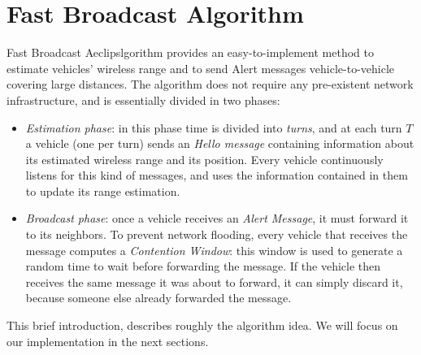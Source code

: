 \section{Fast Broadcast Algorithm}
\label{sec:fast_broadcast}
Fast Broadcast Aeclipslgorithm provides an easy-to-implement method to estimate vehicles' wireless range and to send Alert messages vehicle-to-vehicle covering large distances. The algorithm does not require any pre-existent network infrastructure, and is essentially divided in two phases:
	\begin{itemize}
		\item \emph{Estimation phase}: in this phase time is divided into \textit{turns}, and at each turn $T$ a vehicle (one per turn) sends an \emph{Hello message} containing information about its estimated wireless range and its position. Every vehicle continuously listens for this kind of messages, and uses the information contained in them to update its range estimation.
		\item \emph{Broadcast phase}: 
		once a vehicle receives an \textit{Alert Message}, it must forward it to its neighbors. To prevent network flooding, every vehicle that receives the message computes a \textit{Contention Window}: this window is used to generate a random time to wait before forwarding the message. If the vehicle then receives the same message it was about to forward, it can simply discard it, because someone else already forwarded the message.
	\end{itemize} 
	
This brief introduction, describes roughly the algorithm idea. We will focus on our implementation in the next sections.
